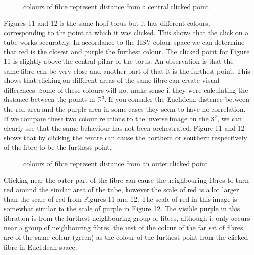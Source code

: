 \documentclass[12pt]{article} %
\begin{document}
\begin{flushleft}
\begin{figure}[H] %
\caption{colours of fibre represent distance from a central clicked point}
\label{fig:speciation}
\end{figure}
Figures 11 and 12 is the same hopf torus but it has different colours, corresponding to the point at which it was clicked. This shows that the click on a tube works accurately. In accordance to the HSV colour space we can determine that red is the closest and purple the furthest colour. The clicked point for Figure 11 is slightly above the central pillar of the torus. An observation is that the same fibre can be very close and another part of that it is the furthest point. This shows that clicking on different areas of the same fibre can create visual differences. Some of these colours will not make sense if they were calculating the distance between the points in $\mathbb{R}^{3}$. If you consider the Euclidean distance between the red area and the purple area in some cases they seem to have no correlation. If we compare these two colour relations to the inverse image on the S$^{2}$, we can clearly see that the same behaviour has not been orchestrated. Figure 11 and 12 shows that by clicking the centre can cause the northern or southern respectively of the fibre to be the furthest point.  
\begin{figure}[H] %
\caption{colours of fibre represent distance from an outer clicked point}
\label{fig:speciation}
\end{figure}
Clicking near the outer part of the fibre can cause the neighbouring fibres to turn red around the similar area of the tube, however the scale of red is a lot larger than the scale of red from Figures 11 and 12. The scale of red in this image is somewhat similar to the scale of purple in Figure 12. The visible purple in this fibration is from the furthest neighbouring group of fibres, although it only occurs near a group of neighbouring fibres, the rest of the colour of the far set of fibres are of the same colour (green) as the colour of the furthest point from the clicked fibre in Euclidean space.  

\end{flushleft}
\end{document}
